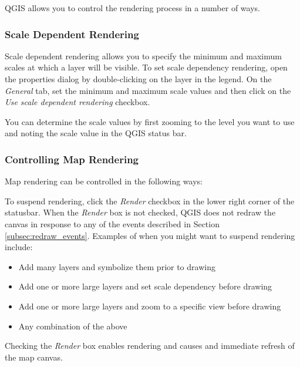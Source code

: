 QGIS allows you to control the rendering process in a number of ways.

\subsubsection{Scale Dependent Rendering}
\label{label_scaledepend}

Scale dependent rendering allows you to specify the minimum and maximum
scales at which a layer will be visible.  To set scale dependency rendering,
open the properties dialog by double-clicking on the layer in the legend. On
the \textit{General} tab, set the minimum and maximum scale values and then
click on the \textit{Use scale dependent rendering} checkbox.

You can determine the scale values by first zooming to the level you want
to use and noting the scale value in the QGIS status bar.

\subsubsection{Controlling Map Rendering}\label{label_controlmap}

Map rendering can be controlled in the following ways:

\label{label_suspendrender}

To suspend rendering, click the \textit{Render} checkbox in the lower right
corner of the statusbar. When the \textit{Render} box is not checked, QGIS
does not redraw the canvas in response to any of the events described in
Section \ref{subsec:redraw_events}. Examples of when you might want to suspend
rendering include:

\begin{itemize}
\item Add many layers and symbolize them prior to drawing
\item Add one or more large layers and set scale dependency before drawing
\item Add one or more large layers and zoom to a specific view before
drawing
\item Any combination of the above
\end{itemize}

Checking the \textit{Render} box enables rendering and causes and immediate
refresh of the map canvas.

\label{label_settinglayer}

